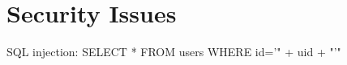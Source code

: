 \documentclass{article}
\begin{document}
\section{Security Issues}
SQL injection: SELECT * FROM users WHERE id='" + uid + "'"
\end{document}
